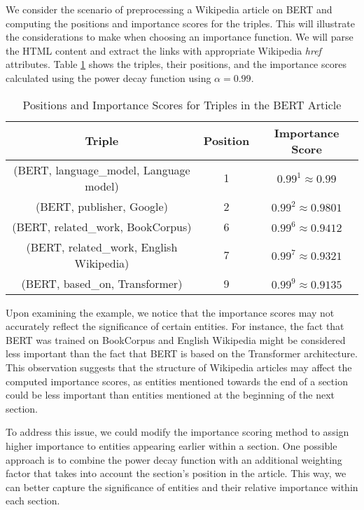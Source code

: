 \documentclass{article}
\begin{document}
We consider the scenario of preprocessing a Wikipedia article on BERT and computing the positions and importance scores for the triples. This will illustrate the considerations to make when choosing an importance function. We will parse the HTML content and extract the links with appropriate Wikipedia \textit{href} attributes. Table \ref{table:1} shows the triples, their positions, and the importance scores calculated using the power decay function using $\alpha = 0.99$.

\begin{table}[h]
  \label{table:1}
  \centering
  \begin{tabular}{|c|c|c|}
    \hline
    Triple & Position & Importance Score \\
    \hline
    (BERT, language\_model, Language model) & 1 & $0.99^{1} \approx 0.99$ \\
    (BERT, publisher, Google) & 2 & $0.99^{2} \approx 0.9801$ \\
    (BERT, related\_work, BookCorpus) & 6 & $0.99^{6} \approx 0.9412$ \\
    (BERT, related\_work, English Wikipedia) & 7 & $0.99^{7} \approx 0.9321$ \\
    (BERT, based\_on, Transformer) & 9 & $0.99^{9} \approx 0.9135$ \\
    \hline
  \end{tabular}

  \caption{Positions and Importance Scores for Triples in the BERT Article}
\end{table}

Upon examining the example, we notice that the importance scores may not accurately reflect the significance of certain entities. For instance, the fact that BERT was trained on BookCorpus and English Wikipedia might be considered less important than the fact that BERT is based on the Transformer architecture. This observation suggests that the structure of Wikipedia articles may affect the computed importance scores, as entities mentioned towards the end of a section could be less important than entities mentioned at the beginning of the next section.

To address this issue, we could modify the importance scoring method to assign higher importance to entities appearing earlier within a section. One possible approach is to combine the power decay function with an additional weighting factor that takes into account the section's position in the article. This way, we can better capture the significance of entities and their relative importance within each section.
\end{document}

